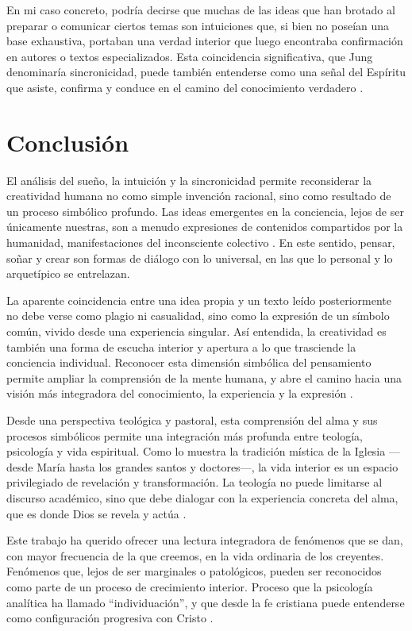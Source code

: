 \documentclass[a4paper,12pt]{article}
\begin{document}
En mi caso concreto, podría decirse que muchas de las ideas que han brotado al preparar o comunicar ciertos temas son intuiciones que, si bien no poseían una base exhaustiva, portaban una verdad interior que luego encontraba confirmación en autores o textos especializados. Esta coincidencia significativa, que Jung denominaría sincronicidad, puede también entenderse como una señal del Espíritu que asiste, confirma y conduce en el camino del conocimiento verdadero \cite{jung1959}.

\section*{Conclusión}

El análisis del sueño, la intuición y la sincronicidad permite reconsiderar la creatividad humana no como simple invención racional, sino como resultado de un proceso simbólico profundo. Las ideas emergentes en la conciencia, lejos de ser únicamente nuestras, son a menudo expresiones de contenidos compartidos por la humanidad, manifestaciones del inconsciente colectivo \cite{jung1959}. En este sentido, pensar, soñar y crear son formas de diálogo con lo universal, en las que lo personal y lo arquetípico se entrelazan.

La aparente coincidencia entre una idea propia y un texto leído posteriormente no debe verse como plagio ni casualidad, sino como la expresión de un símbolo común, vivido desde una experiencia singular. Así entendida, la creatividad es también una forma de escucha interior y apertura a lo que trasciende la conciencia individual. Reconocer esta dimensión simbólica del pensamiento permite ampliar la comprensión de la mente humana, y abre el camino hacia una visión más integradora del conocimiento, la experiencia y la expresión \cite{jung1959}.

Desde una perspectiva teológica y pastoral, esta comprensión del alma y sus procesos simbólicos permite una integración más profunda entre teología, psicología y vida espiritual. Como lo muestra la tradición mística de la Iglesia —desde María hasta los grandes santos y doctores—, la vida interior es un espacio privilegiado de revelación y transformación. La teología no puede limitarse al discurso académico, sino que debe dialogar con la experiencia concreta del alma, que es donde Dios se revela y actúa \cite{jung1959}.

Este trabajo ha querido ofrecer una lectura integradora de fenómenos que se dan, con mayor frecuencia de la que creemos, en la vida ordinaria de los creyentes. Fenómenos que, lejos de ser marginales o patológicos, pueden ser reconocidos como parte de un proceso de crecimiento interior. Proceso que la psicología analítica ha llamado “individuación”, y que desde la fe cristiana puede entenderse como configuración progresiva con Cristo \cite{jung1959}.
\end{document}
